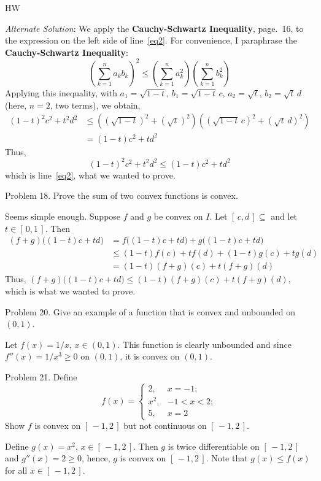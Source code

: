 \documentclass[12pt]{article}
\begin{document}
\begin{exam}{HW}
\begin{problem}[4]
\begin{solution}
\medskip\noindent\textit{Alternate Solution}:
We apply the \textbf{Cauchy-Schwartz Inequality}, page.~16, to the expression on the left side of line~\eqref{eq2}.
For convenience, I paraphrase the \textbf{Cauchy-Schwartz Inequality}:
\[
    \left(\sum_{k=1}^n a_k b_k \right)^2 \le  \left(\sum_{k=1}^n a_k^2 \right) \left(\sum_{k=1}^n b_k^2 \right)
\]
Applying this inequality, with $a_1 = \sqrt{1-t}$, $b_1 =
\sqrt{1-t}\,c$,  $a_2 = \sqrt{t}$, $b_2 = \sqrt{t}\,d$  (here,
$n=2$, two terms),  we obtain,
\begin{align*}
(1-t)^2 c^2 + t^2 d^2 &
    \le \left( (\sqrt{1-t})^2 + (\sqrt{t})^2\right)\left((\sqrt{1-t}\,c)^2 + (\sqrt{t}\,d)^2\right)\\&
    = (1-t)c^2 + td^2
\end{align*}
Thus,
\[
    (1-t)^2 c^2 + t^2 d^2 \le (1-t)c^2 + td^2
\]
which is line~\eqref{eq2}, what we wanted to prove.
\end{solution}
\end{problem}

\begin{problem}[3]
Problem 18. Prove the sum of two convex functions is convex.
\begin{solution}
Seems simple enough. Suppose $f$ and $g$ be convex on $I$. Let $[\,c,d\,]\subseteq$ and let $t\in[\,0,1\,]$. Then
\begin{align*}
    (f+g)\bigl( (1-t) c + td \bigr) &
        = f\bigl( (1-t) c + td \bigr) + g\bigl( (1-t) c + td \bigr)\\&
        \le (1-t) f(c) + tf(d) + (1-t) g(c) + tg(d)\\&
        = (1-t) (f+g)(c) + t(f+g)(d)
\end{align*}
Thus, $(f+g)\bigl( (1-t) c + td \bigr) \le (1-t) (f+g)(c) + t(f+g)(d)$, which is what we wanted to prove.
\end{solution}
\end{problem}

\begin{problem}[2]
Problem 20. Give an example of a function that is convex and unbounded on $(0,1)$.
\begin{solution}
Let $ f(x) = 1/x $, $ x \in (0,1) $. This function is clearly unbounded and since $ f''(x) = 1/x^3\ge 0$ on $(0,1)$,
it is convex on $(0,1)$.
\end{solution}
\end{problem}

\begin{problem}[4]
Problem 21. Define
\[
    f(x) = \begin{cases}
                2, & x = -1;\\
                x^2, & -1 < x < 2;\\
                5,   & x = 2
           \end{cases}
\]
Show $f$ is convex on $[\,-1,2\,]$ but not continuous on  $[\,-1,2\,]$.
\begin{solution}
Define $g(x) = x^2$, $x\in[\,-1,2\,]$. Then $g$ is twice differentiable on $[\,-1,2\,]$ and $ g''(x) = 2\ge 0$, hence,
$g$ is convex on $[\,-1,2\,]$. Note that $ g(x) \le f(x) $ for all $x\in[\,-1,2\,]$.


\end{solution}
\end{problem}
\end{exam}
\end{document}

